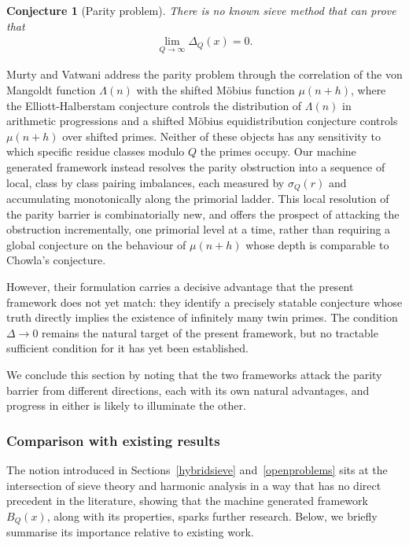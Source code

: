 \documentclass[11pt,reqno]{amsart}
\theoremstyle{plain}\newtheorem{theorem}{Theorem}[section]
\newtheorem{conjecture}{Conjecture}[section]
\numberwithin{equation}{section}
\begin{document}
\begin{conjecture}[Parity problem]
There is no known sieve method that can prove that
\begin{align*}
\lim_{Q\to\infty} \Delta_Q(x)=0.    
\end{align*}    
\end{conjecture}

\noindent
Murty and Vatwani address the parity problem through the correlation of the von Mangoldt function $\Lambda(n)$ with the shifted M\"{o}bius function $\mu(n+h)$, where the Elliott-Halberstam conjecture controls the distribution of $\Lambda(n)$ in arithmetic progressions and a shifted Möbius equidistribution conjecture controls $\mu(n+h)$ over shifted primes. Neither of these objects has any sensitivity to which specific residue classes modulo $Q$ the primes occupy. Our machine generated framework instead resolves the parity obstruction into a sequence of local, class by class pairing imbalances, each measured by $\sigma_Q(r)$ and accumulating monotonically along the primorial ladder. This local resolution of the parity barrier is combinatorially new, and offers the prospect of attacking the obstruction incrementally, one primorial level at a time, rather than requiring a global conjecture on the behaviour of $\mu(n+h)$ whose depth is comparable to Chowla's conjecture.

However, their formulation carries a decisive advantage that the present framework does not yet match: they identify a precisely statable conjecture whose truth directly implies the existence of infinitely many twin primes. The condition $\Delta\to 0$ remains the natural target of the present framework, but no tractable sufficient condition for it has yet been established.

\medskip
\noindent
We conclude this section by noting that the two frameworks attack the parity barrier from different directions, each with its own natural advantages, and progress in either is likely to illuminate the other.



\subsubsection{Comparison with existing results}\label{comparsion}

The notion introduced in Sections~\ref{hybridsieve} and~\ref{openproblems} sits at the intersection of sieve theory and harmonic analysis in a way that has no direct precedent in the literature, showing that the machine generated framework $B_Q(x)$, along with its properties, sparks further research. Below, we briefly summarise its importance relative to existing work.
\end{document}
